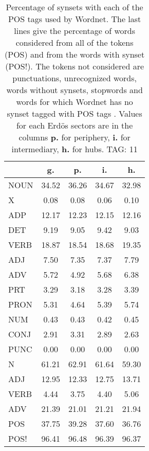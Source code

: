\begin{table}[h!]
\begin{center}
\begin{tabular}{| l || c | c | c | c |}\hline
 & {\bf g.} & {\bf p.} & {\bf i.} & {\bf h.} \\\hline\hline
NOUN & 34.52  & 36.26  & 34.67  & 32.98 \\
X & 0.08  & 0.08  & 0.06  & 0.10 \\\hline
ADP & 12.17  & 12.23  & 12.15  & 12.16 \\
DET & 9.19  & 9.05  & 9.42  & 9.03 \\\hline
VERB & 18.87  & 18.54  & 18.68  & 19.35 \\\hline
ADJ & 7.50  & 7.35  & 7.37  & 7.79 \\
ADV & 5.72  & 4.92  & 5.68  & 6.38 \\\hline
PRT & 3.29  & 3.18  & 3.28  & 3.39 \\
PRON & 5.31  & 4.64  & 5.39  & 5.74 \\
NUM & 0.43  & 0.43  & 0.42  & 0.45 \\
CONJ & 2.91  & 3.31  & 2.89  & 2.63 \\
PUNC & 0.00  & 0.00  & 0.00  & 0.00 \\\hline\hline\hline
N & 61.21  & 62.91  & 61.64  & 59.30 \\\hline
ADJ & 12.95  & 12.33  & 12.75  & 13.71 \\\hline
VERB & 4.44  & 3.75  & 4.40  & 5.06 \\\hline
ADV & 21.39  & 21.01  & 21.21  & 21.94 \\\hline\hline
POS & 37.75  & 39.28  & 37.60  & 36.76 \\\hline
POS! & 96.41  & 96.48  & 96.39  & 96.37 \\\hline
\end{tabular}
\caption{Percentage of synsets with each of the POS tags used by Wordnet. The last lines give the percentage of words considered from all of the tokens (POS) and from the words with synset (POS!). The tokens not considered are punctuations, unrecognized words, words without synsets, stopwords and words for which Wordnet has no synset  tagged with POS tags . Values for each Erd\"os sectors are in the columns {{\bf p.}} for periphery, {{\bf i.}} for intermediary, {{\bf h.}} for hubs. TAG: 11}
\end{center}
\end{table}